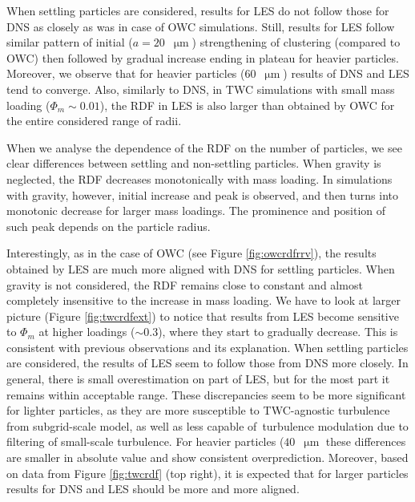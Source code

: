 \documentclass{pracamgren}
\begin{document}
When settling particles are considered, results for LES do not follow those for DNS as closely as was in case of OWC simulations.
Still, results for LES follow similar pattern of initial ($a = 20$~$\upmu\text{m}$) strengthening of clustering (compared to OWC) then followed by gradual increase ending in plateau for heavier particles.
Moreover, we observe that for heavier particles ($60$~$\upmu\text{m}$) results of DNS and LES tend to converge.
Also, similarly to DNS, in TWC simulations with small mass loading ($\Phi_m \sim 0.01$), the RDF  in LES is also larger than obtained by OWC for the entire considered range of radii.

When we analyse the dependence of the RDF on the number of particles, we see clear differences between settling and non-settling particles.
When gravity is neglected, the RDF decreases monotonically with mass loading.
In simulations with gravity, however, initial increase and peak is observed, and then turns into monotonic decrease for larger mass loadings.
The prominence and position of such peak depends on the particle radius.

Interestingly, as in the case of OWC (see Figure \ref{fig:owcrdfrrv}), the results obtained by LES are much more aligned with DNS for settling particles.
When gravity is not considered, the RDF remains close to constant and almost completely insensitive to the increase in mass loading.
We have to look at larger picture (Figure \ref{fig:twcrdfext}) to notice that results from LES become sensitive to $\Phi_m$ at higher loadings ($\sim 0.3$), where they start to gradually decrease.
This is consistent with previous observations and its explanation.
When settling particles are considered, the results of LES seem to follow those from DNS more closely.
In general, there is small overestimation on part of LES, but for the most part it remains within acceptable range.
These discrepancies seem to be more significant for lighter particles, as they are more susceptible to TWC-agnostic turbulence from subgrid-scale model, as well as less capable of~turbulence modulation due to filtering of small-scale turbulence.
For heavier particles ($40$~$\upmu\text{m}$ these differences are smaller in absolute value and show consistent overprediction.
Moreover, based on data from Figure \ref{fig:twcrdf} (top right), it is expected that for larger particles results for DNS and LES should be more and more aligned.
\end{document}
